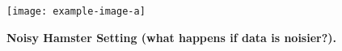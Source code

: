 \begin{figure}[t]
    \centering
    \texttt{[image: example-image-a]}
    \caption{\textbf{Noisy Hamster Setting (what happens if data is noisier?).} 
    \lipsum[2]
    }
    \label{fig:noisy_gaussian}
\end{figure}

